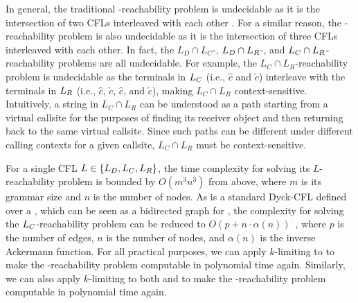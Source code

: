 In general, the traditional \manuLFC-reachability problem \cite{sridharan2006refinement} is undecidable as it is the intersection of
 two CFLs interleaved with each other \cite{reps2000undecidability}.  For
 a similar reason,
the \LFCR-reachability problem is also undecidable as it is the intersection of
 three CFLs interleaved with each other. In fact, the $L_D \cap L_C$-, $\mbox{${L}_D$} \cap \mbox{${L}_R$}$-, and $\mbox{${L}_C$} \cap \mbox{${L}_R$}$-reachability problems are all undecidable.  For example,
 the $L_C \cap L_R$-reachability problem is undecidable as  the terminals in $\mbox{$L_C$}$ (i.e., $\hat{c}$ and $\check{c}$) interleave with the terminals in $\mbox{${L}_R$}$ (i.e., 
 $\hat{c}$, $\check{c}$,
 $\hat{\boxed{c}}$, and $\check{\boxed{c}}$), making  $L_C \cap L_R$  context-sensitive. Intuitively, a string in $L_C \cap L_R$ can be understood as a path starting from a virtual callsite for the purposes of finding its receiver object and then returning back to the same virtual callsite. Since such paths can be different under different calling contexts for a given callsite, $L_C \cap L_R$ must be context-sensitive.  
 
 
 For a single CFL  $L \in \{\mbox{${L}_D$}, \mbox{${L}_C$}, \mbox{${L}_R$}\}$, the time complexity for solving its $L$-reachability problem is bounded by $O(m^3n^3)$ from above, where $m$ is  its grammar size and $n$ is the number of \pag nodes. As \LC is a standard Dyck-CFL defined over a \pag,
 which can be seen as a bidirected graph for \LC,
the complexity for solving the $\mbox{${L}_C$}$-reachability problem
can be  reduced to $O(p + n\cdot \alpha(n))$~\cite{chatterjee2017optimal}, where $p$ is the number of \pag edges,  $n$ is the number of  \pag nodes, and $\alpha(n)$ is the inverse Ackermann function.
 For all practical purposes, we can apply  $k$-limiting  to \LC to make the
 \manuLFC-reachability problem computable in polynomial time again. Similarly, we can also
 apply  $k$-limiting  to both \LC and \LR to make the 
 \LFCR-reachability problem computable in polynomial time again.

